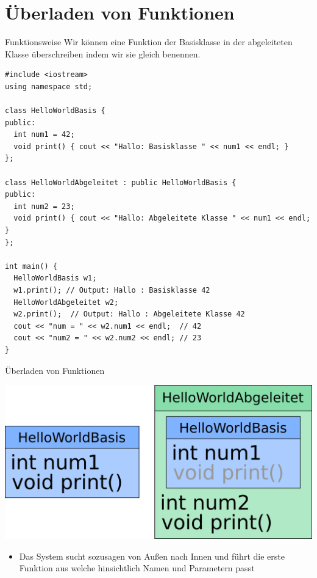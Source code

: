 \documentclass[presentation]{beamer}
\begin{document}
\section{Überladen von Funktionen}
\label{sec:org3bb0f33}
\begin{frame}[fragile,label={sec:org3cf9603}]{Funktionsweise}
 Wir können eine Funktion der Basisklasse in der abgeleiteten Klasse
überschreiben indem wir sie gleich benennen.
\begin{verbatim}
#include <iostream>
using namespace std;

class HelloWorldBasis {
public:
  int num1 = 42;
  void print() { cout << "Hallo: Basisklasse " << num1 << endl; }
};

class HelloWorldAbgeleitet : public HelloWorldBasis {
public:
  int num2 = 23;
  void print() { cout << "Hallo: Abgeleitete Klasse " << num1 << endl; }
};

int main() {
  HelloWorldBasis w1;
  w1.print(); // Output: Hallo : Basisklasse 42
  HelloWorldAbgeleitet w2;
  w2.print();  // Output: Hallo : Abgeleitete Klasse 42
  cout << "num = " << w2.num1 << endl;  // 42
  cout << "num2 = " << w2.num2 << endl; // 23
}
\end{verbatim}
\end{frame}
\begin{frame}[label={sec:orgc3ea7d7}]{Überladen von Funktionen}
\begin{center}\begin{center}
\includegraphics[width=.9\linewidth]{imgs/overload.png}
\end{center}\end{center}
\begin{itemize}
\item Das System sucht sozusagen von \alert{Außen nach Innen} und führt die
erste Funktion aus welche hinsichtlich Namen und Parametern passt
\end{itemize}
\end{frame}
\end{document}
